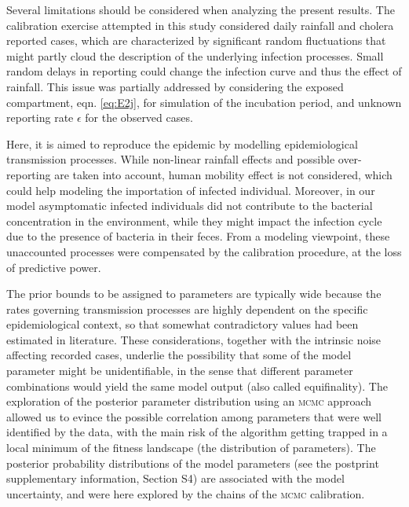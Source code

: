 Several limitations should be considered when analyzing the present results. The calibration exercise attempted in this study considered daily rainfall and cholera reported cases, which are characterized by significant random fluctuations that might partly cloud the description of the underlying infection processes. 
Small random delays in reporting could change the infection curve and thus the effect of rainfall. This issue was partially addressed by considering the exposed compartment, eqn. \eqref{eq:E2j}, for simulation of the incubation period, and unknown reporting rate $\epsilon$ for the observed cases.

Here, it is aimed to reproduce the epidemic by modelling epidemiological transmission processes. %
While non-linear rainfall effects and possible over-reporting are taken into account, human mobility effect\cite{Gatto:GeneralizedReproductionNumbers:2012,Bertuzzo:SpatiallyExplicitModels:2010,Mari:PredictiveAbilityMechanistic:2015,Perez-Saez:ClimatedrivenEndemicCholera:2017} is not considered, which could help modeling the importation of infected individual.  Moreover, in our model asymptomatic infected individuals did not contribute to the bacterial concentration in the environment, while they might impact the infection cycle due to the presence of bacteria in their feces. From a modeling viewpoint, these unaccounted processes were compensated by the calibration procedure, at the loss of predictive power.

The prior bounds to be assigned to parameters are typically wide\cite{Akman:ExaminationModelsCholera:2016} because the rates governing transmission processes are highly dependent on the specific epidemiological context, so that somewhat contradictory values had been estimated in literature. These considerations, together with the intrinsic noise affecting recorded cases, underlie the possibility that some of the model parameter might be unidentifiable\cite{Eisenberg:IdentifiabilityEstimationMultiple:2013}, in the sense that different parameter combinations would yield the same model output (also called equifinality). 
The exploration of the posterior parameter distribution using an \textsc{mcmc} approach allowed us to evince the possible correlation among parameters that were well identified by the data, with the main risk of the algorithm getting trapped in a local minimum of the fitness landscape (the distribution of parameters). The posterior probability distributions of the model parameters (see the postprint supplementary information, Section S4) are associated with the model uncertainty, and were here explored by the chains of the \textsc{mcmc} calibration.

